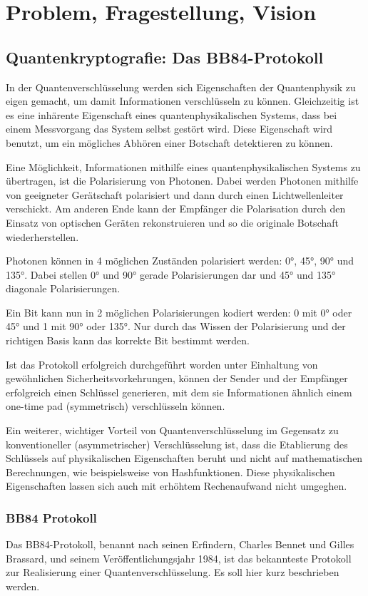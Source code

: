\documentclass[a4paper,10.2pt,pdftex]{scrartcl}%
\begin{document}
\section{Problem, Fragestellung, Vision}
\subsection{Quantenkryptografie: Das BB84-Protokoll} 
In der Quantenverschlüsselung werden sich Eigenschaften der Quantenphysik zu eigen gemacht, um damit Informationen verschlüsseln zu können. Gleichzeitig ist es eine inhärente Eigenschaft eines quantenphysikalischen Systems, dass bei einem Messvorgang das System selbst gestört wird. Diese Eigenschaft wird benutzt, um ein mögliches Abhören einer Botschaft detektieren zu können.

Eine Möglichkeit, Informationen mithilfe eines quantenphysikalischen Systems zu übertragen, ist die Polarisierung von Photonen. Dabei werden Photonen mithilfe von geeigneter Gerätschaft polarisiert und dann durch einen Lichtwellenleiter verschickt. Am anderen Ende kann der Empfänger die Polarisation durch den Einsatz von optischen Geräten rekonstruieren und so die originale Botschaft wiederherstellen.

Photonen können in 4 möglichen Zuständen polarisiert werden: 0°, 45°, 90° und 135°. Dabei stellen 0° und 90° gerade Polarisierungen dar und 45° und 135° diagonale Polarisierungen.

Ein Bit kann nun in 2 möglichen Polarisierungen kodiert werden: 0 mit 0° oder 45° und 1 mit 90° oder 135°. Nur durch das Wissen der Polarisierung und der richtigen Basis kann das korrekte Bit bestimmt werden.

Ist das Protokoll erfolgreich durchgeführt worden unter Einhaltung von gewöhnlichen Sicherheitsvorkehrungen, können der Sender und der Empfänger erfolgreich einen Schlüssel generieren, mit dem sie Informationen ähnlich einem one-time pad (symmetrisch) verschlüsseln können.

Ein weiterer, wichtiger Vorteil von Quantenverschlüsselung im Gegensatz zu konventioneller (asymmetrischer) Verschlüsselung ist, dass die Etablierung des Schlüssels auf physikalischen Eigenschaften beruht und nicht auf mathematischen Berechnungen, wie beispielsweise von Hashfunktionen. Diese physikalischen Eigenschaften lassen sich auch mit erhöhtem Rechenaufwand nicht umgeghen.


\subsubsection{BB84 Protokoll}
Das BB84-Protokoll, benannt nach seinen Erfindern, Charles Bennet und Gilles Brassard, und seinem Veröffentlichungsjahr 1984, ist das bekannteste Protokoll zur Realisierung einer Quantenverschlüsselung. Es soll hier kurz beschrieben werden.
\end{document}
